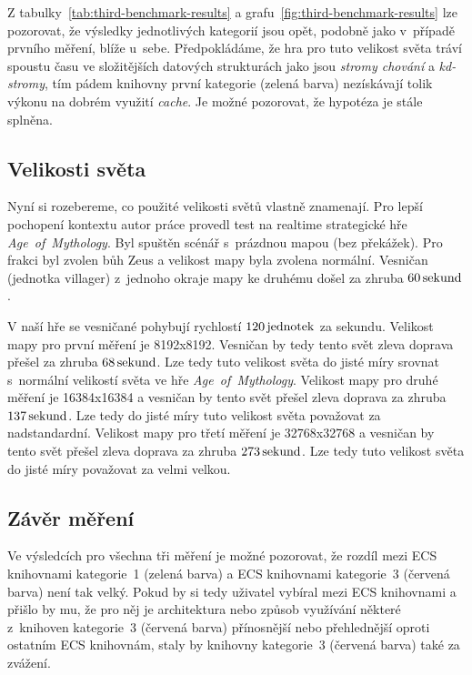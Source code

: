 Z tabulky~\ref{tab:third-benchmark-results} a grafu~\ref{fig:third-benchmark-results} lze pozorovat, že výsledky jednotlivých kategorií jsou opět, podobně jako v~případě prvního měření, blíže u~sebe. Předpokládáme, že hra pro tuto velikost světa tráví spoustu času ve složitějších datových strukturách jako jsou \textit{stromy chování} a \textit{kd-stromy}, tím pádem knihovny první kategorie (zelená barva) nezískávají tolik výkonu na dobrém využití \textit{cache}. Je možné pozorovat, že hypotéza je stále splněna.

\subsection{Velikosti světa}
Nyní si rozebereme, co použité velikosti světů vlastně znamenají. Pro lepší pochopení kontextu autor práce provedl test na realtime strategické hře \textit{Age~of~Mythology}. Byl spuštěn scénář s~prázdnou mapou (bez překážek). Pro frakci byl zvolen bůh Zeus a velikost mapy byla zvolena normální. Vesničan (jednotka villager) z~jednoho okraje mapy ke druhému došel za zhruba $60\,\rm sekund$.

V naší hře se vesničané pohybují rychlostí $120\,\rm jednotek$ za sekundu. Velikost mapy pro první měření je 8192x8192. Vesničan by tedy tento svět zleva doprava přešel za zhruba $68\,\rm sekund$. Lze tedy tuto velikost světa do jisté míry srovnat s~normální velikostí světa ve hře \textit{Age~of~Mythology}. Velikost mapy pro druhé měření je 16384x16384 a vesničan by tento svět přešel zleva doprava za zhruba $137\,\rm sekund$. Lze tedy do jisté míry tuto velikost světa považovat za nadstandardní. Velikost mapy pro třetí měření je 32768x32768 a vesničan by tento svět přešel zleva doprava za zhruba $273\,\rm sekund$. Lze tedy tuto velikost světa do jisté míry považovat za velmi velkou.

\subsection{Závěr měření}
Ve výsledcích pro všechna tři měření je možné pozorovat, že rozdíl mezi ECS knihovnami kategorie~1 (zelená barva) a ECS knihovnami kategorie~3 (červená barva) není tak velký. Pokud by si tedy uživatel vybíral mezi ECS knihovnami a přišlo by mu, že pro něj je architektura nebo způsob využívání některé z~knihoven kategorie~3 (červená barva) přínosnější nebo přehlednější oproti ostatním ECS knihovnám, staly by knihovny kategorie~3 (červená barva) také za zvážení.

